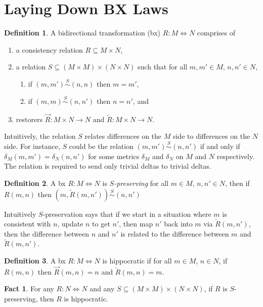 \documentclass[acmsmall,review,anonymous]{acmart}\settopmatter{printfolios=true,printccs=false,printacmref=false}
\theoremstyle{definition}
\newtheorem{definition}{Definition}
\newtheorem{fact}{Fact}
\begin{document}
\section{Laying Down BX Laws}
\begin{definition}
A bidirectional transformation (bx) $R : M \Leftrightarrow N$ comprises of 
\begin{enumerate}
\item
a consistency relation $R \subseteq M \times N$,
\item
a relation $S \subseteq (M \times M) \times (N \times N)$ such that for all $m, m' \in M$, $n, n' \in N$,
\begin{enumerate}
\item
if $(m, m') \stackrel{S}{\sim} (n, n)$ then $m = m'$,
\item
if $(m, m) \stackrel{S}{\sim} (n, n')$ then $n = n'$, and
\end{enumerate}
\item
restorers $\overrightarrow{R} : M \times N \rightarrow N$ and $\overleftarrow{R} : M \times N \longrightarrow
N$.
\end{enumerate}
\end{definition}
Intuitively, the relation $S$ relates differences on the $M$ side to differences on the $N$ side. For instance, $S$ could be the relation $(m, m') \stackrel{S}{\sim} (n,n')$ if and only if $\delta_M(m,m') = \delta_N(n,n')$ for some metrics $\delta_M$ and $\delta_N$ on $M$ and $N$ respectively. The relation is required to send only trivial deltas to trivial deltas.
\begin{definition}
A bx $R : M \Leftrightarrow N$ is {\em $S$-preserving} for all $m \in M$, $n, n' \in N$, then if $R(m, n)$ then $(m, \overleftarrow{R}(m,n')) \stackrel{S}{\sim} (n, n')$
\end{definition}
Intuitively $S$-preservation says that if we start in a situation where $m$ is consistent with $n$, update $n$ to get $n'$, then map $n'$ back into $m$ via $\overleftarrow{R}(m,n')$, then the difference between $n$ and $n'$ is related to the difference between $m$ and $\overleftarrow{R}(m,n')$.
\begin{definition}
A bx $R : M \Leftrightarrow N$ is hippocratic if for all $m \in M$, $n \in N$, if $R(m, n)$ then $\overrightarrow{R}(m, n) = n$ and $\overleftarrow{R}(m,n) = m$.
\end{definition}
\begin{fact}
For any $R : N \Leftrightarrow N$ and any $S \subseteq (M \times M) \times (N \times N)$, if $R$ is $S$-preserving, then $R$ is hippocratic.
\end{fact}
\end{document}
